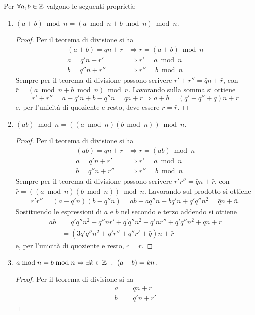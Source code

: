 \begin{proposizione}
Per $\forall a,b\in\operatorname*{\mathbb{Z}}$ valgono le seguenti proprietà:
\begin{enumerate}
\item $(a+b)\bmod n=(a\bmod n + b\bmod n)\bmod n$.
\begin{proof}
Per il teorema di divisione si ha
\begin{align*}
(a+b)=qn+r &\Rightarrow r=(a+b)\bmod n\\
a=q'n+r' &\Rightarrow r'=a\bmod n\\
b=q''n+r'' &\Rightarrow r''=b\bmod n
\end{align*}
Sempre per il teorema di divisione possono scrivere $r'+r''=\bar{q}n+\bar{r}$, con $\bar{r}=(a\bmod n + b\bmod n)\bmod n$. Lavorando sulla somma si ottiene
\[
r'+r''=a-q'n+b-q''n=\bar{q}n+\bar{r} \Rightarrow a+b=(q'+q''+\bar{q})n+\bar{r}
\]
e, per l'unicità di quoziente e resto, deve essere $r=\bar{r}$.
\end{proof}
\item $(ab)\bmod n=((a\bmod n)(b\bmod n))\bmod n$.
\begin{proof}
Per il teorema di divisione si ha
\begin{align*}
(ab)=qn+r &\Rightarrow r=(ab)\bmod n\\
a=q'n+r' &\Rightarrow r'=a\bmod n\\
b=q''n+r'' &\Rightarrow r''=b\bmod n
\end{align*}
Sempre per il teorema di divisione possono scrivere $r'r''=\bar{q}n+\bar{r}$, con $\bar{r}=((a\bmod n)(b\bmod n))\bmod n$. Lavorando sul prodotto si ottiene
\begin{align*}
r'r''=(a-q'n)(b-q''n)=ab-aq''n-bq'n+q'q''n^2 = \bar{q}n+\bar{n}.
\end{align*}
Sostituendo le espressioni di $a$ e $b$ nel secondo e terzo addendo si ottiene
\begin{align*}
ab&=q'q''n^2+q''nr'+q'q''n^2+q'nr''+q'q''n^2+\bar{q}n+\bar{r} \\
&=(3q'q''n^2+q'r''+q''r'+\bar{q})n+\bar{r}
\end{align*}
e, per l'unicità di quoziente e resto, $r=\bar{r}$.
\end{proof}
\item $a\bmod n = b\bmod n \Leftrightarrow \exists k\in\operatorname*{\mathbb{Z}}\ :\ (a-b)=kn$.
\begin{proof}
Per il teorema di divisione si ha
\begin{align*}
a&=qn+r \\
b&=q'n+r'
\end{align*}

\end{proof}
\end{enumerate}
\end{proposizione}
